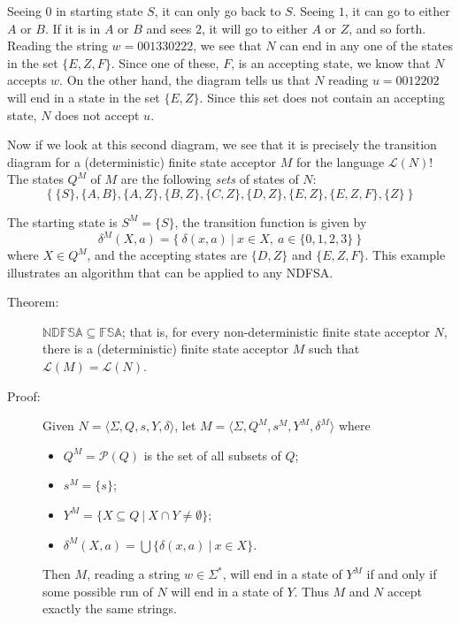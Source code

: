\documentclass{article}
\newcommand{\El}{\mathcal L}
\newcommand{\Ps}{\mathcal P}
\begin{document}
Seeing $0$ in starting state $S$, it can only go back to $S$. Seeing $1$, it can go to either $A$ or $B$. If it is in $A$ or $B$ and sees $2$, it will go to either $A$ or $Z$, and so forth. Reading the string $w = 001330222$, we see that $N$ can end in any one of the states in the set $\{E,Z,F\}$. Since one of these, $F$, is an accepting state, we know that $N$ accepts $w$. On the other hand, the diagram tells us that $N$ reading $u = 0012202$ will end in a state in the set $\{E,Z\}$. Since this set does not contain an accepting state, $N$ does not accept $u$.

Now if we look at this second diagram, we see that it is precisely the transition diagram for a (deterministic) finite state acceptor $M$ for the language $\El(N)$! The states $Q^M$ of $M$ are the following \emph{sets} of states of $N$:
\begin{equation*}
\{\ \{S\}, \{A,B\}, \{A,Z\}, \{B,Z\}, \{C,Z\}, \{D,Z\}, \{E,Z\}, \{E,Z,F\}, \{Z\}\ \}
\end{equation*}

The starting state is $S^M = \{S\}$, the transition function is given by
\begin{equation*}
\delta^M (X,a) = \{\ \delta(x,a)\ |\ x \in X,\ a \in \{0,1,2,3\}\ \}
\end{equation*}
where $X \in Q^M$, and the accepting states are $\{D,Z\}$ and $\{E,Z,F\}$. This example illustrates an algorithm that can be applied to any NDFSA.


\begin{description}

\item[Theorem:] $\mathbb{NDFSA} \subseteq \mathbb{FSA}$; that is, for every non-deterministic finite state acceptor $N$, there is a (deterministic) finite state acceptor $M$ such that $\El(M) = \El(N)$.

\item[Proof:] Given $N = \langle \Sigma, Q, s, Y, \delta \rangle$, let $M = \langle \Sigma, Q^M, s^M, Y^M, \delta^M \rangle$ where
\begin{itemize}
  \item $Q^M = \Ps(Q)$ is the set of all subsets of $Q$;
  \item $s^M = \{s\}$; 
  \item $Y^M = \{X \subseteq Q\ |\ X \cap Y \neq \emptyset \}$; 
  \item $\delta^M(X,a) = \bigcup \{ \delta(x,a)\ |\ x \in X \}$.
\end{itemize}

Then $M$, reading a string $w \in \Sigma^*$, will end in a state of $Y^M$ if and only if some possible run of $N$ will end in a state of $Y$. Thus $M$ and $N$ accept exactly the same strings.

\end{description}
\end{document}
